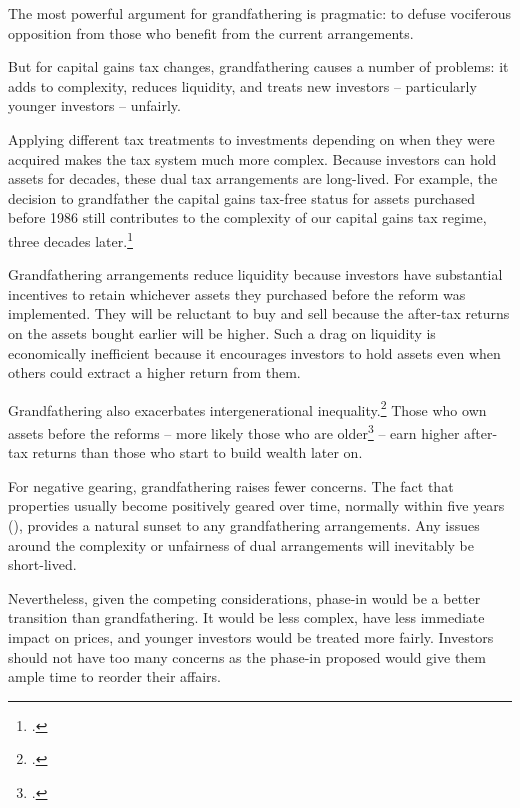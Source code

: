 \documentclass{grattanAlpha}\usepackage[]{graphicx}\usepackage[]{color}
\begin{document}
The most powerful argument for grandfathering is pragmatic: to defuse vociferous opposition from those who benefit from the current arrangements.

But for capital gains tax changes, grandfathering causes a number of problems: it adds to complexity, reduces liquidity, and treats new investors – particularly younger investors – unfairly.

Applying different tax treatments to investments depending on when they were acquired makes the tax system much more complex. Because investors can hold assets for decades, these dual tax arrangements are long-lived.  For example, the decision to grandfather the capital gains tax-free status for assets purchased before 1986 still contributes to the complexity of our capital gains tax regime, three decades later.\footcite[][75]{HenryTaxReview2010} 

Grandfathering arrangements reduce liquidity because investors have substantial incentives to retain whichever assets they purchased before the reform was implemented. They will be reluctant to buy and sell because the after-tax returns on the assets bought earlier will be higher. Such a drag on liquidity is economically inefficient because it encourages investors to hold assets even when others could extract a higher return from them. 

Grandfathering also exacerbates intergenerational inequality.\footcite{DaleyWoodWeidmannEtAl2014}  Those who own assets before the reforms – more likely those who are older\footcite[][14]{DaleyWoodWeidmannEtAl2014}  – earn higher after-tax returns than those who start to build wealth later on. 

For negative gearing, grandfathering raises fewer concerns. The fact that properties usually become positively geared over time, normally within five years (), provides a natural sunset to any grandfathering arrangements. Any issues around the complexity or unfairness of dual arrangements will inevitably be short-lived. 

Nevertheless, given the competing considerations, phase-in would be a better transition than grandfathering. It would be less complex, have less immediate impact on prices, and younger investors would be treated more fairly. Investors should not have too many concerns as the phase-in proposed would give them ample time to reorder their affairs.
\end{document}

